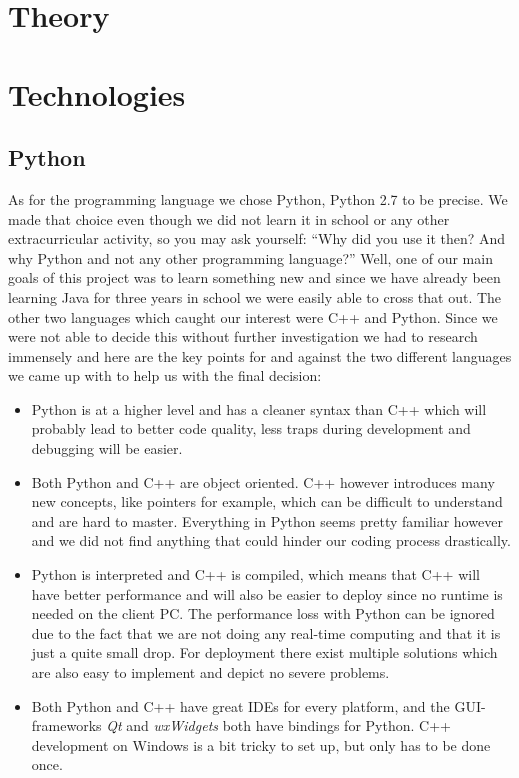 \section{Theory}
\def\kapitelautor{Christoph Führer}

\section{Technologies}
\def\kapitelautor{Christoph Führer}
\subsection{Python}
As for the programming language we chose Python, Python 2.7 to be precise. We made that choice even though we did not learn it in school or any other extracurricular activity, so you may ask yourself: ``Why did you use it then? And why Python and not any other programming language?'' Well, one of our main goals of this project was to learn something new and since we have already been learning Java for three years in school we were easily able to cross that out. The other two languages which caught our interest were C++ and Python. Since we were not able to decide this without further investigation we had to research immensely and here are the key points for and against the two different languages we came up with to help us with the final decision:


\begin{itemize}
	\item Python is at a higher level and has a cleaner syntax than C++ which will probably lead to better code quality, less traps during development and debugging will be easier.
	\item Both Python and C++ are object oriented. C++ however introduces many new concepts, like pointers for example, which can be difficult to understand and are hard to master. Everything in Python seems pretty familiar however and we did not find anything that could hinder our coding process drastically.
	\item Python is interpreted and C++ is compiled, which means that C++ will have better performance and will also be easier to deploy since no runtime is needed on the client PC\@. The performance loss with Python can be ignored due to the fact that we are not doing any real-time computing and that it is just a quite small drop. For deployment there exist multiple solutions which are also easy to implement and depict no severe problems.
	\item Both Python and C++ have great IDEs for every platform, and the GUI-frameworks \emph{Qt} and \emph{wxWidgets} both have bindings for Python. C++ development on Windows is a bit tricky to set up, but only has to be done once.
\end{itemize}

